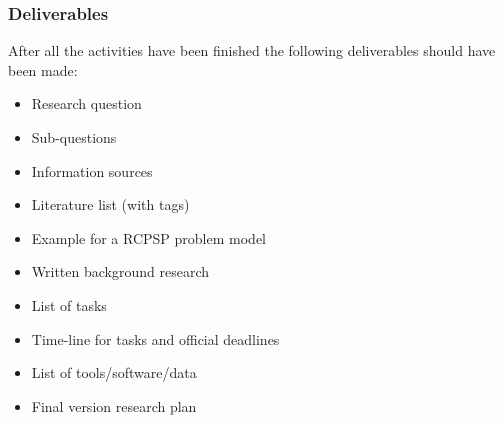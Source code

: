 \documentclass[english]{article}
\begin{document}
\subsubsection{Deliverables}
After all the activities have been finished the following deliverables should have been made:
{\begin{itemize}
    \item Research question
    \item Sub-questions
    \item Information sources
    \item Literature list (with tags)
    \item Example for a RCPSP problem model
    \item Written background research
    \item List of tasks
    \item Time-line for tasks and official deadlines
    \item List of tools/software/data
    \item Final version research plan
\end{itemize}{}}




\end{document}
